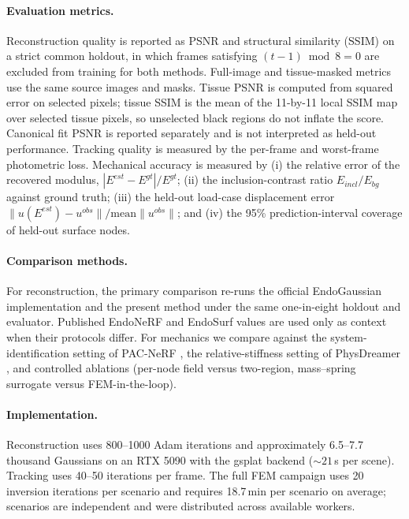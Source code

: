 \documentclass[pdflatex,lineno,referee,sn-vancouver,Numbered]{sn-jnl}
\begin{document}
\paragraph{Evaluation metrics.}
Reconstruction quality is reported as PSNR and structural similarity
(SSIM) on a strict common holdout, in which frames satisfying
$(t-1)\bmod 8=0$ are excluded from training for both methods. Full-image
and tissue-masked metrics use the same source images and masks. Tissue
PSNR is computed from squared error on selected pixels; tissue SSIM is the
mean of the 11-by-11 local SSIM map over selected tissue pixels, so
unselected black regions do not inflate the score. Canonical fit PSNR is
reported separately and is not interpreted as held-out performance.
Tracking quality is measured by the per-frame and worst-frame
photometric loss. Mechanical accuracy is measured by (i) the relative error
of the recovered modulus, $|E^{est} - E^{gt}| / E^{gt}$; (ii) the
inclusion-contrast ratio $E_{incl}/E_{bg}$ against ground truth; (iii) the
held-out load-case displacement error
$\|u(E^{est}) - u^{obs}\| / \mathrm{mean}\|u^{obs}\|$; and (iv) the 95\%
prediction-interval coverage of held-out surface nodes.

\paragraph{Comparison methods.}
For reconstruction, the primary comparison re-runs the official
EndoGaussian implementation \cite{endogaussian} and the present method
under the same one-in-eight holdout and evaluator. Published EndoNeRF
\cite{endonerf} and EndoSurf \cite{endosurf} values are used only as
context when their protocols differ. For mechanics we
compare against the system-identification setting of PAC-NeRF
\cite{pacnerf}, the relative-stiffness setting of PhysDreamer
\cite{physdreamer}, and controlled ablations (per-node field versus
two-region, mass--spring surrogate versus FEM-in-the-loop).

\paragraph{Implementation.}
Reconstruction uses 800--1000 Adam iterations and approximately
6.5--7.7 thousand Gaussians on an RTX 5090 with the gsplat backend
(${\sim}21$\,s per scene). Tracking uses 40--50 iterations per frame.
The full FEM campaign uses 20 inversion iterations per scenario and
requires 18.7\,min per scenario on average; scenarios are independent and
were distributed across available workers.
\end{document}
